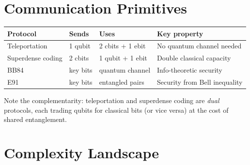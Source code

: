 \documentclass[oneside]{academica}
\begin{document}
\section{Communication Primitives}

\begin{center}
  \renewcommand{\arraystretch}{1.5}
  \begin{tabular}{l|l|l|l}
    \textbf{Protocol} & \textbf{Sends} & \textbf{Uses} & \textbf{Key property} \\
    \hline
    Teleportation & 1 qubit & 2 cbits + 1 ebit & No quantum channel needed \\
    Superdense coding & 2 cbits & 1 qubit + 1 ebit & Double classical capacity \\
    BB84 & key bits & quantum channel & Info-theoretic security \\
    E91 & key bits & entangled pairs & Security from Bell inequality \\
  \end{tabular}
\end{center}

Note the complementarity: teleportation and superdense coding are \emph{dual} protocols, each trading qubits for classical bits (or vice versa) at the cost of shared entanglement.

\section{Complexity Landscape}
\end{document}
